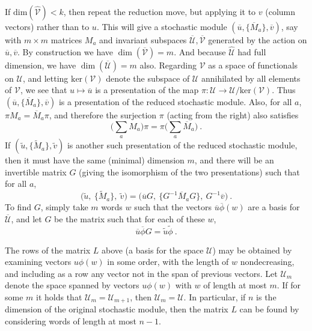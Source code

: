 \documentclass{kepart2010}
\theoremstyle{plain}
\theoremstyle{definition}
\theoremstyle{remark}
\theoremstyle{definition}
\numberwithin{equation}{section}
\begin{document}
If  $\text{dim}(\widehat{\mathcal V})<k$, then repeat the reduction
move, but applying it to $v$ (column vectors) rather than to $u$.
This will give
 a stochastic module
$(\overline u, \{\overline M_a\},\overline v )$, say with $m\times
m$ matrices $M_a$ and invariant subspaces $\overline{ \mathcal
U},\overline{\mathcal V}$ generated by the action on $\overline u,
\overline v$. By construction we have $\dim (\overline{\mathcal
V})=m$. And because $\widehat{\mathcal U}$ had full dimension, we
have $\dim (\overline{\mathcal U})=m$ also. {}{ Regarding $\mathcal
V$ as a space of functionals on $\mathcal U$, and letting
$\text{ker}(\mathcal V)$ denote the subspace of $\mathcal U$
annihilated by all elements of $\mathcal V$, we see that $u\mapsto
\overline u$ is a presentation of the map $\pi: \mathcal U\to
\mathcal U/\text{ker}(\mathcal V)$. Thus $(\overline u, \{\overline
M_a\},\overline v )$ is a presentation of the reduced stochastic
module. Also, for all $a$, $\pi M_a = \overline M_a \pi$, and
therefore the surjection $\pi$ (acting from the right) also
satisfies
\begin{equation}
 \label{intertwine}
\Big(\sum_a M_a \Big)\pi
= \pi \Big(\sum_a \overline M_a \Big)  \ .
\end{equation} }
If $(\widetilde u, \{\widetilde M_a\},\widetilde v )$ is another
such presentation of the reduced stochastic module, then it must
have the same (minimal) dimension $m$, and there will be  an
invertible matrix $G$ {}{(giving the isomorphism of the two
presentations)} such that for all
 $a$,
 \begin{equation} \Big(\widetilde u, \ \{\widetilde M_a\},\ \widetilde v
\Big) = \Big(\overline uG, \ \{G^{-1}\overline M_aG\},\
G^{-1}\overline v \Big) \ .
 \end{equation}
 To find $G$, simply take $m$ words
$w$ such that the vectors $\overline{u}\overline{\phi} (w)$
{are a basis for}  $\overline {{\mathcal U}}$, and let $G$ be the matrix such
that for each of these $w$, \begin{equation} \overline u\overline{\phi} G =
\widetilde u\widetilde{\phi} \ . \end{equation}

The rows of the matrix $L$
above  (a basis for the space $\mathcal U$) may be obtained by examining
vectors $u\phi (w)$ in some order, with the length of $w$
nondecreasing, and including as a row any vector not in the span of
previous vectors. Let $\mathcal U_m$ denote the space spanned by
vectors $u\phi (w)$ with $w$ of length at most $m$.
 If for some $m$ it holds that $\mathcal U_m =
\mathcal U_{m+1}$, then $\mathcal U_m = \mathcal U$.
In particular,
if $n$ is the dimension of the original stochastic module,
then the matrix $L$ can be found by considering words of
length at most  $n-1$.
\end{document}
